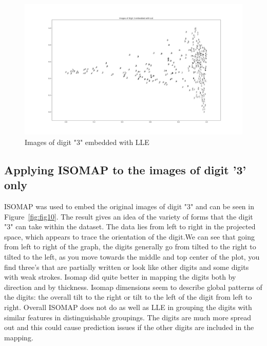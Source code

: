 
\begin{figure}[htb]
 \centering
\includegraphics[width=\textwidth]{assignment1/3-1-LLEembedding.png}
\caption{\label{fig:fig9}Images of digit "3" embedded with LLE}
\end{figure}



\clearpage{}
\subsection{Applying ISOMAP to the images of digit '3' only}

ISOMAP was used to embed the original images of digit "3" and can be seen in Figure~\ref{fig:fig10}. The result gives an idea of the variety of forms that the digit "3" can take within the dataset. The data lies from left to right in the projected space, which appears to trace the orientation of the digit.We can see that going from left to right of the graph, the digits generally go from tilted to the right to tilted to the left, as you move towards the middle and top center of the plot, you find three's that are partially written or look like other digits and some digits with weak strokes. Isomap did quite better in mapping the digits both by direction and by thickness. Isomap dimensions seem to describe global patterns of the digits: the overall tilt to the right or tilt to the left of the digit from left to right. Overall ISOMAP does not do as well as LLE in grouping the digits with similar features in distinguishable groupings. The digits are much more spread out and this could cause prediction issues if the other digits are included in the mapping.


